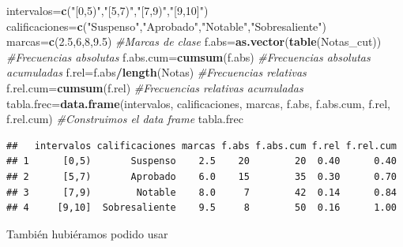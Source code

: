\documentclass[]{book}
\newenvironment{Shaded}{\begin{snugshade}}{\end{snugshade}}
\newcommand{\CommentTok}[1]{\textcolor[rgb]{0.56,0.35,0.01}{\textit{#1}}}
\newcommand{\DataTypeTok}[1]{\textcolor[rgb]{0.13,0.29,0.53}{#1}}
\newcommand{\DecValTok}[1]{\textcolor[rgb]{0.00,0.00,0.81}{#1}}
\newcommand{\FloatTok}[1]{\textcolor[rgb]{0.00,0.00,0.81}{#1}}
\newcommand{\KeywordTok}[1]{\textcolor[rgb]{0.13,0.29,0.53}{\textbf{#1}}}
\newcommand{\NormalTok}[1]{#1}
\newcommand{\OperatorTok}[1]{\textcolor[rgb]{0.81,0.36,0.00}{\textbf{#1}}}
\newcommand{\OtherTok}[1]{\textcolor[rgb]{0.56,0.35,0.01}{#1}}
\newcommand{\StringTok}[1]{\textcolor[rgb]{0.31,0.60,0.02}{#1}}
\theoremstyle{definition}
\theoremstyle{definition}
\theoremstyle{definition}
\theoremstyle{remark}
\begin{document}
\begin{Shaded}
\begin{Highlighting}[]
\NormalTok{intervalos=}\KeywordTok{c}\NormalTok{(}\StringTok{"[0,5)"}\NormalTok{,}\StringTok{"[5,7)"}\NormalTok{,}\StringTok{"[7,9)"}\NormalTok{,}\StringTok{"[9,10]"}\NormalTok{)}
\NormalTok{calificaciones=}\KeywordTok{c}\NormalTok{(}\StringTok{"Suspenso"}\NormalTok{,}\StringTok{"Aprobado"}\NormalTok{,}\StringTok{"Notable"}\NormalTok{,}\StringTok{"Sobresaliente"}\NormalTok{)}
\NormalTok{marcas=}\KeywordTok{c}\NormalTok{(}\FloatTok{2.5}\NormalTok{,}\DecValTok{6}\NormalTok{,}\DecValTok{8}\NormalTok{,}\FloatTok{9.5}\NormalTok{) }\CommentTok{#Marcas de clase}
\NormalTok{f.abs=}\KeywordTok{as.vector}\NormalTok{(}\KeywordTok{table}\NormalTok{(Notas_cut)) }\CommentTok{#Frecuencias absolutas}
\NormalTok{f.abs.cum=}\KeywordTok{cumsum}\NormalTok{(f.abs)  }\CommentTok{#Frecuencias absolutas acumuladas}
\NormalTok{f.rel=f.abs}\OperatorTok{/}\KeywordTok{length}\NormalTok{(Notas) }\CommentTok{#Frecuencias relativas}
\NormalTok{f.rel.cum=}\KeywordTok{cumsum}\NormalTok{(f.rel) }\CommentTok{#Frecuencias relativas acumuladas}
\NormalTok{tabla.frec=}\KeywordTok{data.frame}\NormalTok{(intervalos, calificaciones, marcas, f.abs, }
\NormalTok{   f.abs.cum, f.rel, f.rel.cum)  }\CommentTok{#Construimos el data frame}
\NormalTok{tabla.frec}
\end{Highlighting}
\end{Shaded}

\begin{verbatim}
##   intervalos calificaciones marcas f.abs f.abs.cum f.rel f.rel.cum
## 1      [0,5)       Suspenso    2.5    20        20  0.40      0.40
## 2      [5,7)       Aprobado    6.0    15        35  0.30      0.70
## 3      [7,9)        Notable    8.0     7        42  0.14      0.84
## 4     [9,10]  Sobresaliente    9.5     8        50  0.16      1.00
\end{verbatim}

También hubiéramos podido usar

\begin{Shaded}
\end{Shaded}
\end{document}
